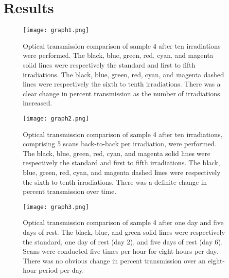 \documentclass{article}
\begin{document}
\section{Results}
\begin{figure}[h]
\centering
\texttt{[image: graph1.png]}
\caption {Optical transmission comparison of sample 4 after ten irradiations were performed. The black, blue, green, red, cyan, and magenta solid lines were respectively the standard and first to fifth irradiations. The black, blue, green, red, cyan, and magenta dashed lines were respectively the sixth to tenth irradiations. There was a clear change in percent transmission as the number of irradiations increased.}
\end{figure}

\begin{figure}[h]
\centering
\texttt{[image: graph2.png]}
\caption{ Optical transmission comparison of sample 4 after ten irradiations, comprising 5 scans back-to-back per irradiation, were performed. The black, blue, green, red, cyan, and magenta solid lines were respectively the standard and first to fifth irradiations. The black, blue, green, red, cyan, and magenta dashed lines were respectively the sixth to tenth irradiations. There was a definite change in percent transmission over time.}
\end{figure}

\begin{figure}[h]
\centering
\texttt{[image: graph3.png]}
\caption{Optical transmission comparison of sample 4 after one day and five days of rest. The black, blue, and green solid lines were respectively the standard, one day of rest (day 2), and five days of rest (day 6). Scans were conducted five times per hour for eight hours per day. There was no obvious change in percent transmission over an eight-hour period per day.}
\end{figure}
\end{document}
